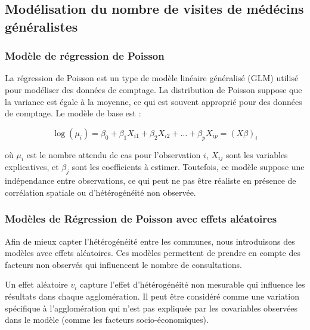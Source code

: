 \documentclass[
]{article}
\begin{document}
\hypertarget{moduxe9lisation-du-nombre-de-visites-de-muxe9duxe9cins-guxe9nuxe9ralistes}{%
\subsection{Modélisation du nombre de visites de médécins
généralistes}\label{moduxe9lisation-du-nombre-de-visites-de-muxe9duxe9cins-guxe9nuxe9ralistes}}

\hypertarget{moduxe8le-de-ruxe9gression-de-poisson}{%
\subsubsection{Modèle de régression de
Poisson}\label{moduxe8le-de-ruxe9gression-de-poisson}}

La régression de Poisson est un type de modèle linéaire généralisé (GLM)
utilisé pour modéliser des données de comptage. La distribution de
Poisson suppose que la variance est égale à la moyenne, ce qui est
souvent approprié pour des données de comptage. Le modèle de base est :

\[
\log(\mu_i) = \beta_0 + \beta_1 X_{i1} + \beta_2 X_{i2} + \dots + \beta_p X_{ip} = (X\beta)_i
\]

où \(\mu_i\) est le nombre attendu de cas pour l'observation \(i\),
\(X_{ij}\) sont les variables explicatives, et \(\beta_j\) sont les
coefficients à estimer. Toutefois, ce modèle suppose une indépendance
entre observations, ce qui peut ne pas être réaliste en présence de
corrélation spatiale ou d'hétérogénéité non observée.

\hypertarget{moduxe8les-de-ruxe9gression-de-poisson-avec-effets-aluxe9atoires}{%
\subsubsection{Modèles de Régression de Poisson avec effets
aléatoires}\label{moduxe8les-de-ruxe9gression-de-poisson-avec-effets-aluxe9atoires}}

Afin de mieux capter l'hétérogénéité entre les communes, nous
introduisons des modèles avec effets aléatoires. Ces modèles permettent
de prendre en compte des facteurs non observés qui influencent le nombre
de consultations.

Un effet aléatoire \(v_i\) capture l'effet d'hétérogénéité non mesurable
qui influence les résultats dans chaque agglomération. Il peut être
considéré comme une variation spécifique à l'agglomération qui n'est pas
expliquée par les covariables observées dans le modèle (comme les
facteurs socio-économiques).
\end{document}
